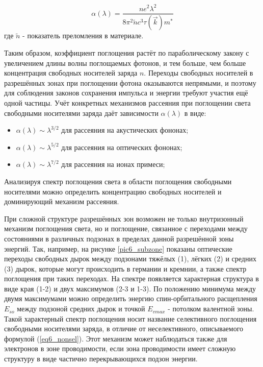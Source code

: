 \begin{equation}
\alpha(\lambda) = \frac{n e^2 \lambda^2}{8 \pi^2 \tilde{n} c^3 \tau(\overrightarrow{k}) m^{*}}
\label{eq6_nonsel}
\end{equation}
где $\tilde{n}$ - показатель преломления в материале.

Таким образом, коэффициент поглощения растёт по параболическому закону с увеличением длины волны поглощаемых фотонов, и тем больше, чем больше концентрация свободных носителей заряда $n$. Переходы свободных носителей в разрешённых зонах при поглощении фотона оказываются непрямыми, и поэтому для соблюдения законов сохранения импульса и энергии требуют участия ещё одной частицы. Учёт конкретных механизмов рассеяния при поглощении света свободными носителями заряда даёт зависимости $\alpha(\lambda)$ в виде:

\begin{itemize}
\item $\alpha(\lambda) \sim \lambda^{3/2}$ для рассеяния на акустических фононах;
\item $\alpha(\lambda) \sim \lambda^{5/2}$ для рассеяния на оптических фононах;
\item $\alpha(\lambda) \sim \lambda^{7/2}$ для рассеяния на ионах примеси;
\end{itemize}

Анализируя спектр поглощения света в области поглощения свободными носителями можно определить концентрацию свободных носителей и доминирующий механизм рассеяния.

При сложной структуре разрешённых зон возможен не только внутризонный механизм поглощения света, но и поглощение, связанное с переходами между состояниями в различных подзонах в пределах данной разрешённой зоны энергий. Так, например, на рисунке \ref{pic6_subzone} показаны оптические переходы свободных дырок между подзонами тяжёлых (1), лёгких (2) и средних (3) дырок, которые могут происходить в германии и кремнии, а также спектр поглощения при таких переходах. На спектре появляется характерная структура в виде края (1-2) и двух максимумов (2-3 и 1-3). По положению минимума между двумя максимумами можно определить энергию спин-орбитального расщепления $E_{so}$ между подзоной средних дырок и точкой $E_{v max}$ - потолком валентной зоны. Такой характерный спектр поглощения носит название селективного поглощения свободными носителями заряда, в отличие от неселективного, описываемого формулой (\ref{eq6_nonsel}). Этот механизм может наблюдаться также для электронов в зоне проводимости, если зона проводимости имеет сложную структуру в виде частично перекрывающихся подзон энергии.

